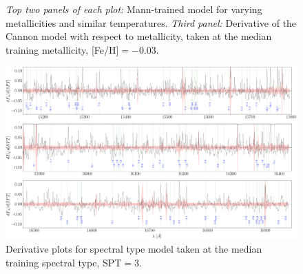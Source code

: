 \documentclass[modern]{aastex62}
\begin{document}
\begin{figure}[ht]
\begin{center}
\end{center}
\caption{\textit{Top two panels of each plot:} Mann-trained model for varying metallicities and similar temperatures. \textit{Third panel:} Derivative of the Cannon model with respect to metallicity, taken at the median training metallicity, [Fe/H]$=-0.03$.} \label{fig:demo_feh}
\end{figure}

\begin{figure}[ht]
\begin{center}
\includegraphics[width=16cm]{figures/derivative_jackknife_spt.png}
\end{center}
\caption{Derivative plots for spectral type model taken at the median training spectral type, SPT$=3$.} \label{fig:west_derivative}
\end{figure}
\end{document}
